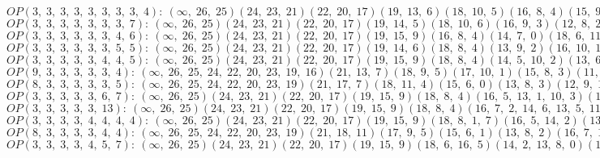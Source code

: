 $OP(3, \;3, \;3, \;3, \;3, \;3, \;3, \;3, \;4): \:(\infty, \;26, \;25)(24, \;23, \;21)(22, \;20, \;17)(19, \;13, \;6)(18, \;10, \;5)(16, \;8, \;4)(15, \;9, \;0)(14, \;7, \;3)(12, \;2, \;11, \;1)$\\
$OP(3, \;3, \;3, \;3, \;3, \;3, \;3, \;7): \:(\infty, \;26, \;25)(24, \;23, \;21)(22, \;20, \;17)(19, \;14, \;5)(18, \;10, \;6)(16, \;9, \;3)(12, \;8, \;2)(15, \;7, \;0, \;11, \;1, \;13, \;4)$\\
$OP(3, \;3, \;3, \;3, \;3, \;3, \;4, \;6): \:(\infty, \;26, \;25)(24, \;23, \;21)(22, \;20, \;17)(19, \;15, \;9)(16, \;8, \;4)(14, \;7, \;0)(18, \;6, \;11, \;5)(13, \;3, \;12, \;1, \;10, \;2)$\\
$OP(3, \;3, \;3, \;3, \;3, \;3, \;5, \;5): \:(\infty, \;26, \;25)(24, \;23, \;21)(22, \;20, \;17)(19, \;14, \;6)(18, \;8, \;4)(13, \;9, \;2)(16, \;10, \;1, \;11, \;5)(15, \;7, \;0, \;12, \;3)$\\
$OP(3, \;3, \;3, \;3, \;3, \;4, \;4, \;5): \:(\infty, \;26, \;25)(24, \;23, \;21)(22, \;20, \;17)(19, \;15, \;9)(18, \;8, \;4)(14, \;5, \;10, \;2)(13, \;6, \;12, \;1)(16, \;7, \;0, \;11, \;3)$\\
$OP(9, \;3, \;3, \;3, \;3, \;3, \;4): \:(\infty, \;26, \;25, \;24, \;22, \;20, \;23, \;19, \;16)(21, \;13, \;7)(18, \;9, \;5)(17, \;10, \;1)(15, \;8, \;3)(11, \;6, \;0)(14, \;4, \;12, \;2)$\\
$OP(8, \;3, \;3, \;3, \;3, \;3, \;5): \:(\infty, \;26, \;25, \;24, \;22, \;20, \;23, \;19)(21, \;17, \;7)(18, \;11, \;4)(15, \;6, \;0)(13, \;8, \;3)(12, \;9, \;1)(16, \;10, \;2, \;14, \;5)$\\
$OP(3, \;3, \;3, \;3, \;3, \;6, \;7): \:(\infty, \;26, \;25)(24, \;23, \;21)(22, \;20, \;17)(19, \;15, \;9)(18, \;8, \;4)(16, \;5, \;13, \;1, \;10, \;3)(14, \;7, \;2, \;11, \;0, \;12, \;6)$\\
$OP(3, \;3, \;3, \;3, \;3, \;13): \:(\infty, \;26, \;25)(24, \;23, \;21)(22, \;20, \;17)(19, \;15, \;9)(18, \;8, \;4)(16, \;7, \;2, \;14, \;6, \;13, \;5, \;11, \;0, \;12, \;1, \;10, \;3)$\\
$OP(3, \;3, \;3, \;3, \;4, \;4, \;4, \;4): \:(\infty, \;26, \;25)(24, \;23, \;21)(22, \;20, \;17)(19, \;15, \;9)(18, \;8, \;1, \;7)(16, \;5, \;14, \;2)(13, \;4, \;12, \;0)(11, \;6, \;10, \;3)$\\
$OP(8, \;3, \;3, \;3, \;3, \;4, \;4): \:(\infty, \;26, \;25, \;24, \;22, \;20, \;23, \;19)(21, \;18, \;11)(17, \;9, \;5)(15, \;6, \;1)(13, \;8, \;2)(16, \;7, \;14, \;3)(12, \;4, \;10, \;0)$\\
$OP(3, \;3, \;3, \;3, \;4, \;5, \;7): \:(\infty, \;26, \;25)(24, \;23, \;21)(22, \;20, \;17)(19, \;15, \;9)(18, \;6, \;16, \;5)(14, \;2, \;13, \;8, \;0)(12, \;4, \;11, \;7, \;1, \;10, \;3)$\\
